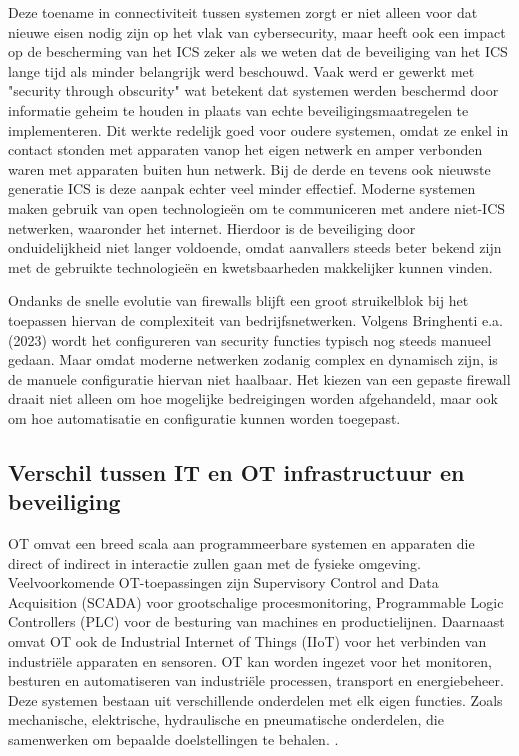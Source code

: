 Deze toename in connectiviteit tussen systemen zorgt er niet alleen voor dat nieuwe eisen nodig zijn op het vlak van cybersecurity, maar heeft ook een impact op de bescherming van het ICS zeker als we weten dat de beveiliging van het ICS lange tijd als minder belangrijk werd beschouwd. Vaak werd er gewerkt met "security through obscurity" wat betekent dat systemen werden beschermd door informatie geheim te houden in plaats van echte beveiligingsmaatregelen te implementeren. Dit werkte redelijk goed voor oudere systemen, omdat ze enkel in contact stonden met apparaten vanop het eigen netwerk en amper verbonden waren met apparaten buiten hun netwerk. Bij de derde en tevens ook nieuwste generatie ICS is deze aanpak echter veel minder effectief. Moderne systemen maken gebruik van open technologieën om te communiceren met andere niet-ICS netwerken, waaronder het internet. Hierdoor is de beveiliging door onduidelijkheid niet langer voldoende, omdat aanvallers steeds beter bekend zijn met de gebruikte technologieën en kwetsbaarheden makkelijker kunnen vinden. \autocite{knowles2015}

Ondanks de snelle evolutie van firewalls blijft een groot struikelblok bij het toepassen hiervan de complexiteit van bedrijfsnetwerken. Volgens Bringhenti e.a. (2023) wordt het configureren van security functies typisch nog steeds manueel gedaan. Maar omdat moderne netwerken zodanig complex en dynamisch zijn, is de manuele configuratie hiervan niet haalbaar. Het kiezen van een gepaste firewall draait niet alleen om hoe mogelijke bedreigingen worden afgehandeld, maar ook om hoe automatisatie en configuratie kunnen worden toegepast.


\subsection{Verschil tussen IT en OT infrastructuur en beveiliging}

OT omvat een breed scala aan programmeerbare systemen en apparaten die direct of indirect in interactie zullen gaan met de fysieke omgeving. Veelvoorkomende OT-toepassingen zijn Supervisory Control and Data Acquisition (SCADA) voor grootschalige procesmonitoring, Programmable Logic Controllers (PLC) voor de besturing van machines en productielijnen. Daarnaast omvat OT ook de Industrial Internet of Things (IIoT) voor het verbinden van industriële apparaten en sensoren. OT kan worden ingezet voor het monitoren, besturen en automatiseren van industriële processen, transport en energiebeheer. Deze systemen bestaan uit verschillende onderdelen met elk eigen functies. Zoals mechanische, elektrische, hydraulische en pneumatische onderdelen, die samenwerken om bepaalde doelstellingen te behalen. \autocite{Stouffer2023}.

